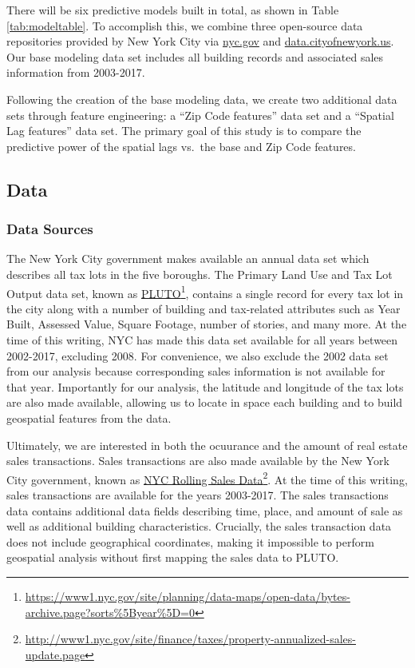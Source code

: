 \documentclass[12pt,]{article}
\let\rmarkdownfootnote\footnote%
\def\footnote{\protect\rmarkdownfootnote}
\begin{document}
\noindent There will be six predictive models built in total, as shown
in Table \ref{tab:modeltable}. To accomplish this, we combine three
open-source data repositories provided by New York City via
\url{nyc.gov} and \url{data.cityofnewyork.us}. Our base modeling data
set includes all building records and associated sales information from
2003-2017.

Following the creation of the base modeling data, we create two
additional data sets through feature engineering: a ``Zip Code
features'' data set and a ``Spatial Lag features'' data set. The primary
goal of this study is to compare the predictive power of the spatial
lags vs.~the base and Zip Code features.

\hypertarget{data}{%
\subsection{Data}\label{data}}

\hypertarget{data-sources}{%
\subsubsection{Data Sources}\label{data-sources}}

The New York City government makes available an annual data set which
describes all tax lots in the five boroughs. The Primary Land Use and
Tax Lot Output data set, known as
\href{https://www1.nyc.gov/site/planning/data-maps/open-data/bytes-archive.page?sorts\%5Byear\%5D=0}{PLUTO}\footnote{\url{https://www1.nyc.gov/site/planning/data-maps/open-data/bytes-archive.page?sorts\%5Byear\%5D=0}},
contains a single record for every tax lot in the city along with a
number of building and tax-related attributes such as Year Built,
Assessed Value, Square Footage, number of stories, and many more. At the
time of this writing, NYC has made this data set available for all years
between 2002-2017, excluding 2008. For convenience, we also exclude the
2002 data set from our analysis because corresponding sales information
is not available for that year. Importantly for our analysis, the
latitude and longitude of the tax lots are also made available, allowing
us to locate in space each building and to build geospatial features
from the data.

Ultimately, we are interested in both the ocuurance and the amount of
real estate sales transactions. Sales transactions are also made
available by the New York City government, known as
\href{http://www1.nyc.gov/site/finance/taxes/property-annualized-sales-update.page}{NYC
Rolling Sales Data}\footnote{\url{http://www1.nyc.gov/site/finance/taxes/property-annualized-sales-update.page}}.
At the time of this writing, sales transactions are available for the
years 2003-2017. The sales transactions data contains additional data
fields describing time, place, and amount of sale as well as additional
building characteristics. Crucially, the sales transaction data does not
include geographical coordinates, making it impossible to perform
geospatial analysis without first mapping the sales data to PLUTO.
\end{document}
